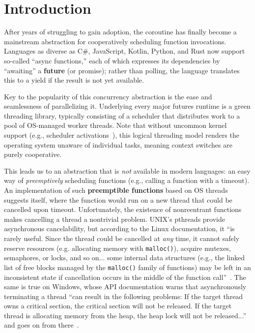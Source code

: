 \section{Introduction}
\label{sec:intro}

After years of struggling to gain adoption, the coroutine has finally become a
mainstream abstraction for cooperatively scheduling function invocations.  Languages
as diverse as C\#, JavaScript, Kotlin, Python, and Rust now support so-called ``async
functions,'' each of which expresses its dependencies by ``awaiting'' a
\textbf{future} (or promise); rather than polling, the language translates this to a
yield if the result is not yet available.

Key to the popularity of this concurrency abstraction is the ease and seamlessness of
parallelizing it.  Underlying every major futures runtime is a green threading
library, typically consisting of a scheduler that distributes work to a pool of
OS-managed worker threads.  Note that without uncommon kernel
support (e.g., scheduler activations~\cite{anderson:sosp1991}), this logical
threading model renders the operating system unaware of individual tasks, meaning
context switches are purely cooperative.

This leads us to an abstraction that is \textit{not} available in modern languages:\@
an easy way of \textit{preemptively} scheduling functions (e.g., calling a function
with a timeout).  An implementation of such \textbf{preemptible functions} based on
OS threads suggests itself, where the function would run on a new thread that
could be cancelled upon timeout.  Unfortunately, the existence of nonreentrant
functions makes cancelling a thread a nontrivial problem.  UNIX's pthreads provide
asynchronous cancelability, but according to the Linux documentation, it ``is rarely
useful.  Since the thread could be cancelled at \textit{any} time, it cannot safely
reserve resources (e.g.  allocating memory with \texttt{malloc()}), acquire mutexes,
semaphores, or locks, and so on... some internal data structures (e.g., the linked
list of free blocks managed by the \texttt{malloc()} family of functions) may be left
in an inconsistent state if cancellation occurs in the middle of the function
call''~\cite{pthreadsetcanceltype-manpage}.  The same is true on Windows, whose API
documentation warns that asynchronously terminating a thread ``can result in the
following problems: If the target thread owns a critical section, the critical
section will not be released.  If the target thread is allocating memory from the
heap, the heap lock will not be released...'' and goes on from
there~\cite{www-microsoft-terminatethread}.

